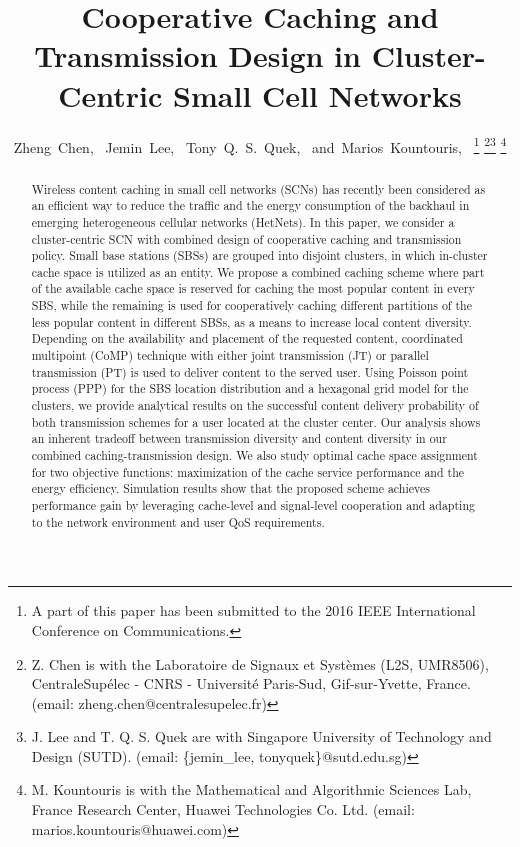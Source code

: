 \documentclass[twocolumns,10pt]{IEEEtran}
\begin{document}
\title{Cooperative Caching and Transmission Design in Cluster-Centric Small Cell Networks}



\author{Zheng~Chen,~ Jemin~Lee,~ Tony~Q.~S.~Quek,~
	and~Marios~Kountouris,~
	\thanks{
	A part of this paper has been submitted to the 2016 IEEE International Conference on Communications.}
	\thanks{Z. Chen is with the Laboratoire de Signaux et Syst\`{e}mes (L2S, UMR8506),
		CentraleSup\'{e}lec - CNRS - Universit\'{e} Paris-Sud,
		Gif-sur-Yvette, France. (email: zheng.chen@centralesupelec.fr)}\thanks{J. Lee and T. Q. S. Quek are with Singapore University of Technology and Design (SUTD). (email: \{jemin\_lee, tonyquek\}@sutd.edu.sg) }
	\thanks{M. Kountouris is with the Mathematical and Algorithmic Sciences Lab, France Research Center, Huawei Technologies Co. Ltd. (email: marios.kountouris@huawei.com) }}

\maketitle
	
	
\begin{abstract}	
Wireless content caching in small cell networks (SCNs) has recently been considered as an efficient way to reduce the traffic and the energy consumption of the backhaul in emerging heterogeneous cellular networks (HetNets).
In this paper, we consider a cluster-centric SCN with combined design of cooperative caching and transmission policy. Small base stations (SBSs) are grouped into disjoint clusters, in which in-cluster cache space is utilized as an entity. We propose a combined caching scheme where part of the available cache space is reserved for caching the most popular content in every SBS, while the remaining is used for cooperatively caching different partitions of the less popular content in different SBSs, as a means to increase local content diversity. Depending on the availability and placement of the requested content, coordinated multipoint (CoMP) technique with either joint transmission (JT) or parallel transmission (PT) is used to deliver content to the served user. Using Poisson point process (PPP) for the SBS location distribution and a hexagonal grid model for the clusters, we provide analytical results on the successful content delivery probability of both transmission schemes for a user located at the cluster center. Our analysis shows an inherent tradeoff between transmission diversity and content diversity in our combined caching-transmission design. We also study optimal cache space assignment for two objective functions: maximization of the cache service performance and the energy efficiency. Simulation results show that the proposed scheme achieves performance gain by leveraging cache-level and signal-level cooperation and adapting to the network environment and user QoS requirements.
\end{abstract}
\end{document}
